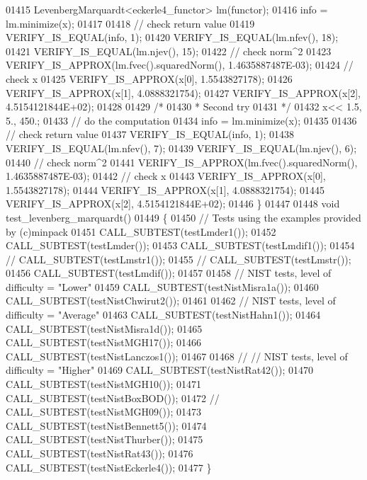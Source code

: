 \begin{DoxyCode}
01415   LevenbergMarquardt<eckerle4\_functor> lm(functor);
01416   info = lm.minimize(x);
01417 
01418   \textcolor{comment}{// check return value}
01419   VERIFY\_IS\_EQUAL(info, 1);
01420   VERIFY\_IS\_EQUAL(lm.nfev(), 18);
01421   VERIFY\_IS\_EQUAL(lm.njev(), 15);
01422   \textcolor{comment}{// check norm^2}
01423   VERIFY\_IS\_APPROX(lm.fvec().squaredNorm(), 1.4635887487E-03);
01424   \textcolor{comment}{// check x}
01425   VERIFY\_IS\_APPROX(x[0], 1.5543827178);
01426   VERIFY\_IS\_APPROX(x[1], 4.0888321754);
01427   VERIFY\_IS\_APPROX(x[2], 4.5154121844E+02);
01428 
01429   \textcolor{comment}{/*}
01430 \textcolor{comment}{   * Second try}
01431 \textcolor{comment}{   */}
01432   x<< 1.5, 5., 450.;
01433   \textcolor{comment}{// do the computation}
01434   info = lm.minimize(x);
01435 
01436   \textcolor{comment}{// check return value}
01437   VERIFY\_IS\_EQUAL(info, 1);
01438   VERIFY\_IS\_EQUAL(lm.nfev(), 7);
01439   VERIFY\_IS\_EQUAL(lm.njev(), 6);
01440   \textcolor{comment}{// check norm^2}
01441   VERIFY\_IS\_APPROX(lm.fvec().squaredNorm(), 1.4635887487E-03);
01442   \textcolor{comment}{// check x}
01443   VERIFY\_IS\_APPROX(x[0], 1.5543827178);
01444   VERIFY\_IS\_APPROX(x[1], 4.0888321754);
01445   VERIFY\_IS\_APPROX(x[2], 4.5154121844E+02);
01446 \}
01447 
01448 \textcolor{keywordtype}{void} test\_levenberg\_marquardt()
01449 \{
01450     \textcolor{comment}{// Tests using the examples provided by (c)minpack}
01451     CALL\_SUBTEST(testLmder1());
01452     CALL\_SUBTEST(testLmder());
01453     CALL\_SUBTEST(testLmdif1());
01454 \textcolor{comment}{//     CALL\_SUBTEST(testLmstr1());}
01455 \textcolor{comment}{//     CALL\_SUBTEST(testLmstr());}
01456     CALL\_SUBTEST(testLmdif());
01457 
01458     \textcolor{comment}{// NIST tests, level of difficulty = "Lower"}
01459     CALL\_SUBTEST(testNistMisra1a());
01460     CALL\_SUBTEST(testNistChwirut2());
01461 
01462     \textcolor{comment}{// NIST tests, level of difficulty = "Average"}
01463     CALL\_SUBTEST(testNistHahn1());
01464     CALL\_SUBTEST(testNistMisra1d());
01465     CALL\_SUBTEST(testNistMGH17());
01466     CALL\_SUBTEST(testNistLanczos1());
01467 
01468 \textcolor{comment}{//     // NIST tests, level of difficulty = "Higher"}
01469     CALL\_SUBTEST(testNistRat42());
01470     CALL\_SUBTEST(testNistMGH10());
01471     CALL\_SUBTEST(testNistBoxBOD());
01472 \textcolor{comment}{//     CALL\_SUBTEST(testNistMGH09());}
01473     CALL\_SUBTEST(testNistBennett5());
01474     CALL\_SUBTEST(testNistThurber());
01475     CALL\_SUBTEST(testNistRat43());
01476     CALL\_SUBTEST(testNistEckerle4());
01477 \}
\end{DoxyCode}
